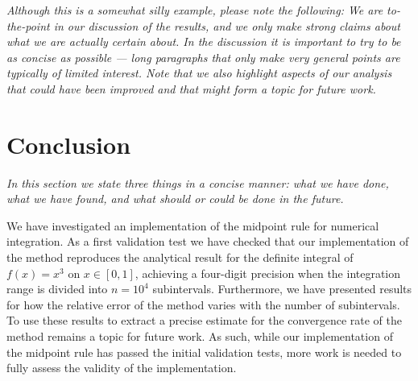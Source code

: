 \documentclass[english,notitlepage,reprint,nofootinbib]{revtex4-1}  %
\begin{document}
\textit{Although this is a somewhat silly example, please note the following: We are to-the-point in our discussion of the results, and we only make strong claims about what we are actually certain about. In the discussion it is important to try to be as concise as possible --- long paragraphs that only make very general points are typically of limited interest. Note that we also highlight aspects of our analysis that could have been improved and that might form a topic for future work.}


\section{Conclusion}\label{sec:conclusion}
\textit{In this section we state three things in a concise manner: what we have done, what we have found, and what should or could be done in the future.}

We have investigated an implementation of the midpoint rule for numerical integration. As a first validation test we have checked that our implementation of the method reproduces the analytical result for the definite integral of $f(x) = x^3$ on $x \in [0,1]$, achieving a four-digit precision when the integration range is divided into $n=10^4$ subintervals. Furthermore, we have presented results for how the relative error of the method varies with the number of subintervals. To use these results to extract a precise estimate for the convergence rate of the method remains a topic for future work. As such, while our implementation of the midpoint rule has passed the initial validation tests, more work is needed to fully assess the validity of the implementation.

\onecolumngrid

%

\end{document}
